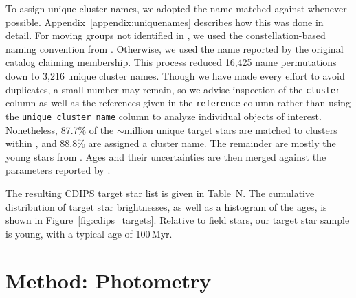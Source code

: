 \documentclass[12pt,twocolumn,tighten]{aastex62}
\begin{document}
To assign unique cluster names, we adopted the name matched against
\citet{Kharchenko_et_al_2013} whenever possible.
Appendix~\ref{appendix:uniquenames} describes  how this was done in detail.
For moving groups not identified in \citet{Kharchenko_et_al_2013}, we used
the constellation-based naming convention from
\citet{gagne_banyan_XI_2018}.  Otherwise, we used the name reported by
the original catalog claiming membership.  This process reduced 16,425
name permutations down to 3,216 unique cluster names.  Though we have
made every effort to avoid duplicates, a small number may remain, so we
advise inspection of the \texttt{cluster} column
as well as the references given in the
\texttt{reference} column rather than using the
\texttt{unique\_cluster\_name} column to analyze individual objects
of interest.  Nonetheless, 87.7\% of the $\sim$million unique target
stars are matched to clusters within \citet{Kharchenko_et_al_2013},
and 88.8\% are assigned a cluster name.  The remainder are mostly the
young stars from \citet{zari_3d_2018}.
Ages and their uncertainties are then merged against the 
parameters reported by \citet{Kharchenko_et_al_2013}.

The resulting CDIPS target star list is given in Table~N.
The cumulative distribution of target star brightnesses, as well as a
histogram of the ages, is shown in Figure~\ref{fig:cdips_targets}.
Relative to field stars, our target star sample is young, with a
typical age of 100$\,$Myr.






\section{Method: Photometry}
\label{sec:method}
\end{document}
